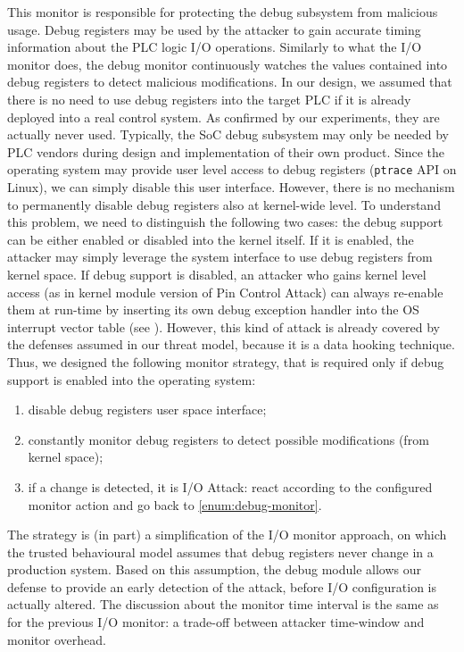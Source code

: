 This monitor is responsible for protecting the debug subsystem from malicious usage. Debug registers may be used by the attacker to gain accurate timing
information about the PLC logic I/O operations.
Similarly to what the I/O monitor does, the debug monitor continuously watches the values contained into debug registers to detect malicious modifications.
In our design, we assumed that there is no need to use debug registers into the target PLC if it is already deployed into a real control system.
As confirmed by our experiments, they are actually never used.
Typically, the SoC debug subsystem may only be needed by PLC vendors during design and implementation of their own product.
Since the operating system may provide user level access to debug registers (\eg \verb|ptrace| API on Linux), we can simply disable this user interface.
However, there is no mechanism to permanently disable debug registers also at kernel-wide level.
To understand this problem, we need to distinguish the following two cases: the debug support can be either enabled or disabled into the kernel itself.
If it is enabled, the attacker may simply leverage the system interface to use debug registers from kernel space.
If debug support is disabled, an attacker who gains kernel level access (as in kernel module version of Pin Control Attack) can always re-enable them at run-time
by inserting its own debug exception handler into the OS interrupt vector table (see \cite{arm-evt,x86-idt}).
However, this kind of attack is already covered by the defenses assumed in our threat model, because it is a data hooking technique.
Thus, we designed the following monitor strategy, that is required only if debug support is enabled into the operating system:
\begin{enumerate}
	\item disable debug registers user space interface;
	\item \label{enum:debug-monitor} constantly monitor debug registers to detect possible modifications (from kernel space);
	\item if a change is detected, it is I/O Attack: react according to the configured monitor action and go back to \ref{enum:debug-monitor}.
\end{enumerate}
The strategy is (in part) a simplification of the I/O monitor approach, on which the trusted behavioural model assumes that debug registers never change in a production system.
Based on this assumption, the debug module allows our defense to provide an early detection of the attack, before I/O configuration is actually altered.
The discussion about the monitor time interval is the same as for the previous I/O monitor: a trade-off between attacker time-window and monitor overhead.

